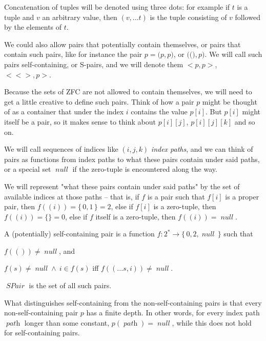 \documentclass[oneside,12pt]{book}
\theoremstyle{definition}
\theoremstyle{remark}
\newcommand\var[1]{\mathop{\mathit{#1}}\nolimits}
\newcommand{\pair}[2]{{(}#1, #2{)}}
\newcommand{\pairZ}{{(}{)}}
\newcommand{\SPair}{\var{SPair}}
\newcommand{\sPair}[2]{{<}#1, #2{>}}
\newcommand{\sPairZ}{{<}{>}}
\newcommand{\nullVal}{\var{null}}
\begin{document}
\begin{defBox}
  Concatenation of tuples will be denoted using three dots: for example if $t$ is a tuple
  and $v$ an arbitrary value, then $( v, ...t )$ is the tuple consisting of $v$
  followed by the elements of $t$.
\end{defBox}

We could also allow pairs that potentially contain themselves, or pairs that contain
such pairs, like for instance the pair $p = \pair{p}{p}$, or $\pair{\pairZ}{p}$.
We will call such pairs self-containing, or S-pairs, and we will denote them
$\sPair{p}{p}$, $\sPair{\sPairZ}{p}$.

Because the sets of ZFC are not allowed to contain themselves, we will
need to get a little creative to define such pairs.
Think of how a pair $p$ might be thought of as a container that under the index
$i$ contains the value $p[i]$. But $p[i]$ might itself be a pair, so it makes
sense to think about $p[i][j]$, $p[i][j][k]$ and so on.

We will call sequences of indices like $(i, j, k)$ \textit{index paths}, and we
can think of pairs as functions from index paths to what these pairs contain under
said paths, or a special set $\nullVal$ if the zero-tuple is encountered along the way.

We will represent "what these pairs contain under said paths" by the set of available
indices at those paths -- that is, if $f$ is a pair such that $f[i]$ is a proper pair,
then $f((i)) = \{\,0, 1\,\} = 2$, else if $f[i]$ is a zero-tuple, then
$f((i)) = \{\} = 0$, else if $f$ itself is a zero-tuple, then $f((i)) = \nullVal$.

\begin{defBox}
  A (potentially) self-containing pair is a function
  $f\colon 2^* \to \{\,0, 2, \nullVal\,\}$ such that
  \begin{compactitem}
    \item $f(()) \neq \nullVal$, and
    \item $f(s) \neq \nullVal \land~i \in f(s)$ iff $f(( ...s, i)) \neq \nullVal$.
  \end{compactitem}
  
  \medskip \noindent $\SPair$ is the set of all such pairs.\footnotemark
\end{defBox}

What distinguishes self-containing from the non-self-containing pairs is that
every non-self-containing pair $p$ has a finite depth. In other words, for every
index path $\var{path}$ longer than some constant, $p(\var{path}) = \nullVal$,
while this does not hold for self-containing pairs.
\end{document}
